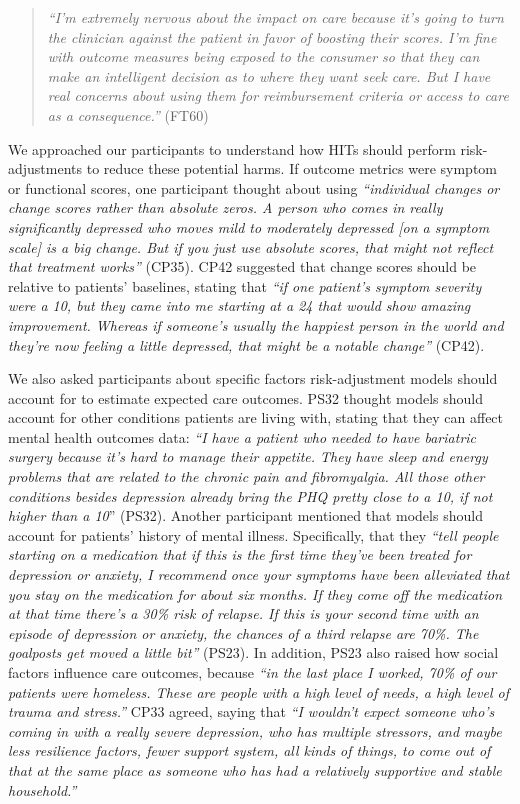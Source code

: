 \begin{quote}
    \textit{``I'm extremely nervous about the impact on care because it's going to turn the clinician against the patient in favor of boosting their scores. 
    I'm fine with outcome measures being exposed to the consumer so that they can make an intelligent decision as to where they want seek care. 
    But I have real concerns about using them for reimbursement criteria or access to care as a consequence.''} (FT60)
\end{quote}

We approached our participants to understand how HITs should perform risk-adjustments to reduce these potential harms.
If outcome metrics were symptom or functional scores, one participant thought about using \textit{``individual changes or change scores rather than absolute zeros. A person who comes in really significantly depressed who moves mild to moderately depressed [on a symptom scale] is a big change. But if you just use absolute scores, that might not reflect that treatment works''} (CP35).
CP42 suggested that change scores should be relative to patients' baselines, stating that \textit{``if one patient's symptom severity were a 10, but they came into me starting at a 24 that would show amazing improvement. Whereas if someone's usually the happiest person in the world and they're now feeling a little depressed, that might be a notable change''} (CP42).

We also asked participants about specific factors risk-adjustment models should account for to estimate expected care outcomes.
PS32 thought models should account for other conditions patients are living with, stating that they can affect mental health outcomes data: \textit{``I have a patient who needed to have bariatric surgery because it's hard to manage their appetite. They have sleep and energy problems that are related to the chronic pain and fibromyalgia. All those other conditions besides depression already bring the PHQ pretty close to a 10, if not higher than a 10}'' (PS32).
Another participant mentioned that models should account for patients' history of mental illness.
Specifically, that they \textit{``tell people starting on a medication that if this is the first time they've been treated for depression or anxiety, I recommend once your symptoms have been alleviated that you stay on the medication for about six months. If they come off the medication at that time there's a 30\% risk of relapse. If this is your second time with an episode of depression or anxiety, the chances of a third relapse are 70\%. The goalposts get moved a little bit''} (PS23).
In addition, PS23 also raised how social factors influence care outcomes, because \textit{``in the last place I worked, 70\% of our patients were homeless. These are people with a high level of needs, a high level of trauma and stress.''}
CP33 agreed, saying that \textit{``I wouldn't expect someone who's coming in with a really severe depression, who has multiple stressors, and maybe less resilience factors, fewer support system, all kinds of things, to come out of that at the same place as someone who has had a relatively supportive and stable household.''}


